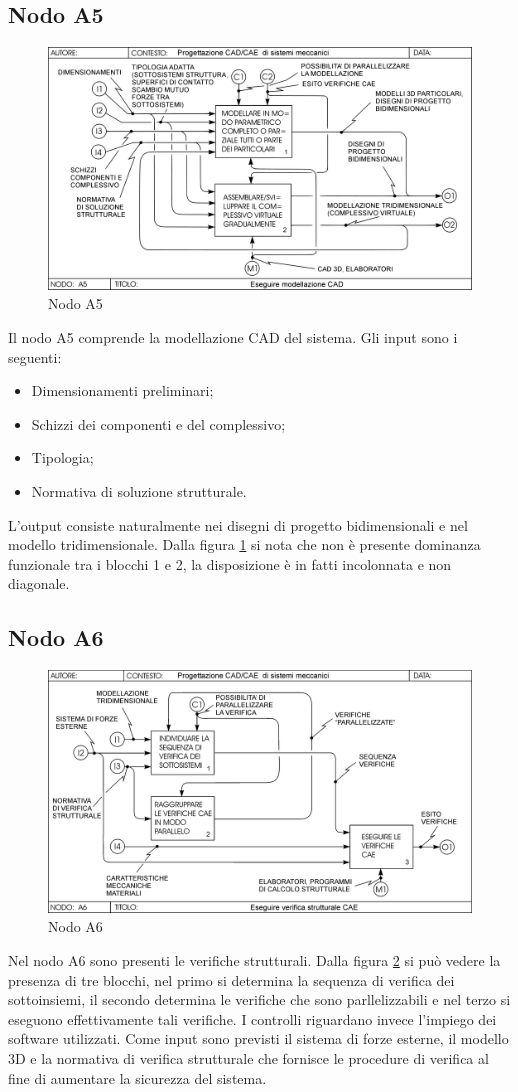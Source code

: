 \subsection{Nodo A5}
\begin{figure}[h!]
\centering
  \includegraphics[width=.7\textwidth]{imgs/NodoA5.pdf}
\caption{Nodo A5}
\label{fig:NodoA5}
\end{figure}
Il nodo A5 comprende la modellazione CAD del sistema. 
Gli input sono i seguenti:
\begin{itemize}
\item Dimensionamenti preliminari;
\item Schizzi dei componenti e del complessivo;
\item Tipologia;
\item Normativa di soluzione strutturale.
\end{itemize}
L'output consiste naturalmente nei disegni di progetto bidimensionali e nel modello tridimensionale. Dalla figura \ref{fig:NodoA5} si nota che non è presente dominanza funzionale tra i blocchi 1 e 2, la disposizione è in fatti incolonnata e non diagonale. 

\subsection{Nodo A6}
\begin{figure}[h!]
\centering
  \includegraphics[width=.6\textwidth]{imgs/NodoA6.pdf}
\caption{Nodo A6}
\label{fig:NodoA6}
\end{figure}
Nel nodo A6 sono presenti le verifiche strutturali. Dalla figura \ref{fig:NodoA6} si può vedere la presenza di tre blocchi, nel primo si determina la sequenza di verifica dei sottoinsiemi, il secondo determina le verifiche che sono parllelizzabili e nel terzo si eseguono effettivamente tali verifiche.
I controlli riguardano invece l'impiego dei software utilizzati.
Come input sono previsti il sistema di forze esterne, il modello 3D e la normativa di verifica strutturale che fornisce le procedure di verifica al fine di aumentare la sicurezza del sistema.

